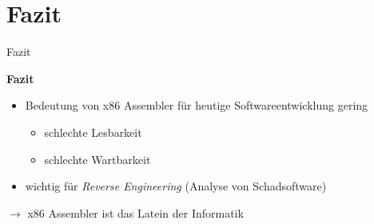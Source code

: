 \section{Fazit}

\begin{frame}{Fazit}
	\begin{center}
		\textbf{Fazit}
	\end{center}

	\begin{itemize}
		\item Bedeutung von x86 Assembler für heutige Softwareentwicklung gering
		\begin{itemize}
			\item schlechte Lesbarkeit
			\item schlechte Wartbarkeit
		\end{itemize}

		\item wichtig für \textit{Reverse Engineering} (Analyse von Schadsoftware)
	\end{itemize}
	
	\makebox{}

	$\rightarrow$ x86 Assembler ist das Latein der Informatik
\end{frame}
